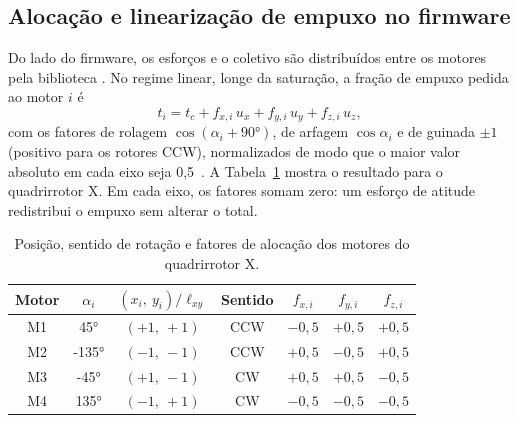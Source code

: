\subsection{Alocação e linearização de empuxo no firmware}
\label{sec:alocacao-firmware}

Do lado do firmware, os esforços e o coletivo são distribuídos entre os
motores pela biblioteca . No regime linear, longe da
saturação, a fração de empuxo pedida ao motor $i$ é
\begin{equation}
t_i = t_c + f_{x,i}\,u_x + f_{y,i}\,u_y + f_{z,i}\,u_z,
\label{eq:mistura}
\end{equation}
com os fatores de rolagem $\cos(\alpha_i + \ang{90})$, de arfagem
$\cos\alpha_i$ e de guinada $\pm 1$ (positivo para os rotores CCW),
normalizados de modo que o maior valor absoluto em cada eixo seja
0,5~\cite{ardupilot2026}. A Tabela~\ref{tab:fatores} mostra o resultado para
o quadrirrotor X. Em cada eixo, os fatores somam zero: um esforço de atitude
redistribui o empuxo sem alterar o total.

\begin{table}[htbp]
\centering
\caption{Posição, sentido de rotação e fatores de alocação dos motores do
quadrirrotor X.}
\label{tab:fatores}
\begin{tabular}{ccccccc}
\toprule
Motor & $\alpha_i$ & $(x_i,\ y_i)/\ell_{xy}$ & Sentido & $f_{x,i}$ & $f_{y,i}$ & $f_{z,i}$ \\
\midrule
M1 & \ang{45}   & $(+1,\ +1)$ & CCW & $-0{,}5$ & $+0{,}5$ & $+0{,}5$ \\
M2 & \ang{-135} & $(-1,\ -1)$ & CCW & $+0{,}5$ & $-0{,}5$ & $+0{,}5$ \\
M3 & \ang{-45}  & $(+1,\ -1)$ & CW  & $+0{,}5$ & $+0{,}5$ & $-0{,}5$ \\
M4 & \ang{135}  & $(-1,\ +1)$ & CW  & $-0{,}5$ & $-0{,}5$ & $-0{,}5$ \\
\bottomrule
\end{tabular}

\end{table}


